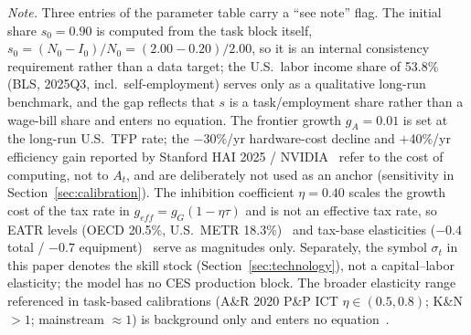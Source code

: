 \documentclass[review,12pt]{elsarticle}
\theoremstyle{plain}
\theoremstyle{definition}
\theoremstyle{remark}
\begin{document}
\noindent\footnotesize\textit{Note.} Three entries of the parameter table carry a ``see note'' flag. The initial share $s_0=0.90$ is computed from the task block itself, $s_0=(N_0-I_0)/N_0=(2.00-0.20)/2.00$, so it is an internal consistency requirement rather than a data target; the U.S.\ labor income share of 53.8\% (BLS, 2025Q3, incl.\ self-employment) serves only as a qualitative long-run benchmark, and the gap reflects that $s$ is a task/employment share rather than a wage-bill share and enters no equation. The frontier growth $g_A=0.01$ is set at the long-run U.S.\ TFP rate; the $-$30\%/yr hardware-cost decline and $+$40\%/yr efficiency gain reported by Stanford HAI 2025 / NVIDIA~\cite{HHSAI} refer to the cost of computing, not to $A_t$, and are deliberately not used as an anchor (sensitivity in Section~\ref{sec:calibration}). The inhibition coefficient $\eta=0.40$ scales the growth cost of the tax rate in $g_{eff}=g_G(1-\eta\tau)$ and is not an effective tax rate, so EATR levels (OECD 20.5\%, U.S.\ METR 18.3\%)~\cite{OECD2026} and tax-base elasticities ($-0.4$ total / $-0.7$ equipment)~\cite{DLL2014} serve as magnitudes only. Separately, the symbol $\sigma_t$ in this paper denotes the skill stock (Section~\ref{sec:technology}), not a capital--labor elasticity; the model has no CES production block. The broader elasticity range referenced in task-based calibrations (A\&R 2020 P\&P ICT $\eta\in(0.5,0.8)$; K\&N $>1$; mainstream $\approx1$) is background only and enters no equation~\cite{AR2020pandp,KN2014}.
\normalsize
\end{document}
